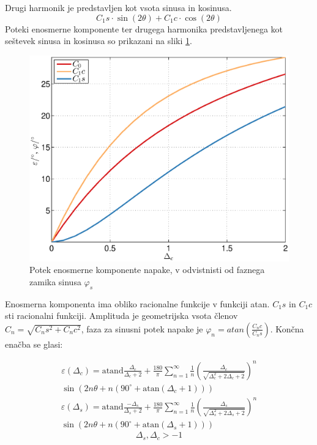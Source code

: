 \documentclass[a4paper]{article}
\begin{document}
Drugi harmonik je predstavljen kot vsota sinusa in kosinusa.
\begin{equation}
C_1s \cdot\sin(2\theta)+C_1c \cdot\cos(2\theta)
\end{equation}
Poteki enosmerne komponente ter drugega harmonika predstavljenega kot seštevek sinusa in kosinusa so prikazani na sliki \ref{fig:dc}.
\begin{figure}[!htb]
	\begin{center}
		\includegraphics[width=\linewidth]{./Slike/dc.eps}
		\caption{Potek enosmerne komponente napake, v odvistnisti od faznega zamika sinusa $\varphi_{s}$} \label{fig:dc}
	\end{center}
\end{figure}

Enosmerna komponenta ima obliko racionalne funkcije v funkciji atan.
$C_1s$ in $C_1c$ sti racionalni funkciji. Amplituda je geometrijska vsota členov $C_n = \sqrt{C_ns^2+C_nc^2}$, faza za sinusni potek napake je $\varphi_{n} = atan(\frac{C_nc}{C_ns})$. Končna enačba se glasi:

\begin{multline}
\label{equ:dc_err}
\varepsilon(\Delta_c) = \mathrm{atand}\frac{\Delta_c}{\Delta_c+2}+\frac{180}{\pi} \sum_{n=1}^{\infty}\frac{1}{n} (\frac{\Delta_c}{\sqrt{\Delta_c^2+2 \Delta_c+2}})^n\\ \sin (2n \theta+n (90^\circ+ \mathrm{ atan}(\Delta_c+1)))
\end{multline}
\begin{multline}
\label{equ:ds_err}
\varepsilon(\Delta_s) = \mathrm{atand}\frac{-\Delta_s}{\Delta_s+2}+\frac{180}{\pi} \sum_{n=1}^{\infty}\frac{1}{n} (\frac{\Delta_s}{\sqrt{\Delta_s^2+2 \Delta_s+2}})^n\\ \sin (2n \theta+n (90^\circ+ \mathrm{ atan}(\Delta_s+1)))
\end{multline}
\begin{equation*}
\Delta_s, \Delta_c > -1
\end{equation*}
\end{document}
